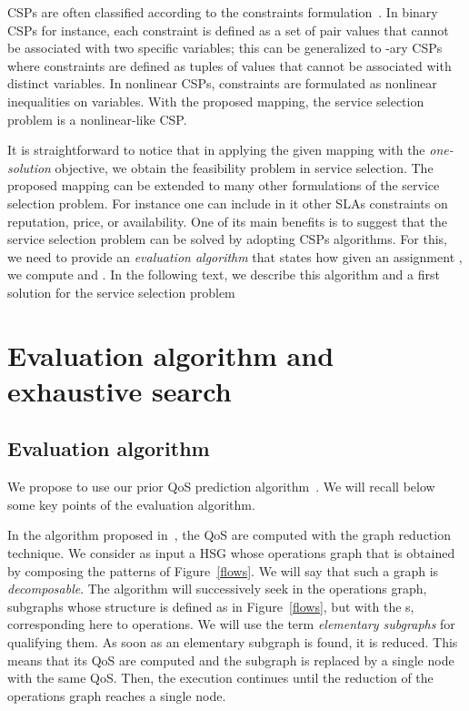 \documentclass[a4paper]{article}
\begin{document}
CSPs are often classified according to the constraints formulation~\cite{Baker95intelligentbacktracking}. 
In binary CSPs for instance, each constraint is defined as a set of pair values that cannot be associated 
with two specific variables; this can be generalized to -ary CSPs where constraints are defined as 
tuples of  values that cannot be associated with  distinct variables. In nonlinear CSPs, constraints are 
formulated as nonlinear inequalities on variables. With the proposed mapping, 
the service selection problem is a nonlinear-like CSP. 

It is straightforward to notice that in 
applying the given mapping with the {\it one-solution} objective, we obtain the feasibility problem 
in service selection. 
The proposed mapping can be extended to many other formulations of the service selection problem. 
For instance one can include in it other SLAs constraints on reputation, price, or availability. 
One of its main benefits is to suggest that the service selection problem can be solved by adopting CSPs 
algorithms. For this, we need to provide an {\it evaluation algorithm} that states how given an 
assignment , we compute  and . 
In the following text, we describe this algorithm and a first solution for the service selection problem


\section{Evaluation algorithm and exhaustive search} \label{exhaustiveSearch}

\subsection{Evaluation algorithm} \label{evaluationAlgorithm}

We propose to use our prior QoS prediction algorithm~\cite{GoldmanNgoko}. 
We will recall below some key points of the evaluation algorithm.

In the algorithm proposed in~\cite{GoldmanNgoko}, the QoS are computed with the graph reduction technique. 
We consider as input a HSG whose operations graph that is obtained by composing the patterns of Figure~\ref{flows}. We 
will say that such a graph is {\it decomposable}. The algorithm will successively seek in the operations graph,  
subgraphs whose structure is defined as in Figure~\ref{flows}, but with the s, corresponding 
here to operations. We will use the term \textit{elementary subgraphs} for qualifying them. 
As soon as an elementary subgraph is found, it is reduced. This means that its QoS 
are computed and the subgraph is replaced by a single node with the same QoS. Then, the execution 
continues until the reduction of the operations graph reaches a single node.
\end{document}
